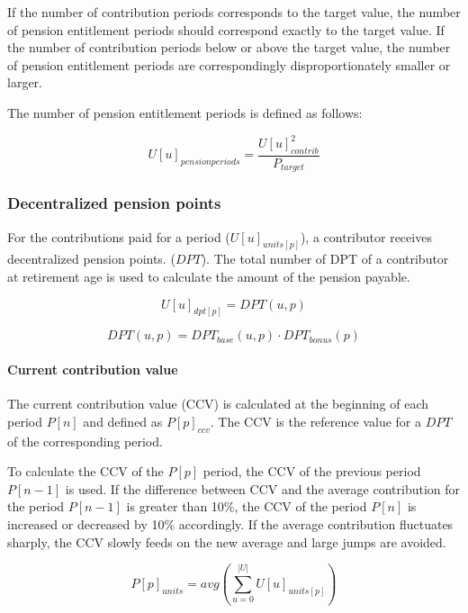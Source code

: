If the number of contribution periods corresponds to the target value, the number of pension entitlement periods should correspond exactly to the target value. If the number of contribution periods below or above the target value, the number of pension entitlement periods are correspondingly disproportionately smaller or larger.  

The number of pension entitlement periods is defined as follows:

\begin{equation}
U[u]_{pensionperiods} = \frac{U[u]_{contrib}^2}{P_{target}}
\end{equation}


\subsubsection{Decentralized pension points}
For the contributions paid for a period ($U[u]_{units[p]}$), a contributor receives decentralized pension points.
($DPT$). The total number of DPT of a contributor at retirement age is used to calculate the amount of the pension payable.

\begin{equation}
U[u]_{dpt[p]} = DPT(u, p)
\end{equation}

\begin{equation}
DPT(u, p) = DPT_{base}(u, p) \cdot DPT_{bonus}(p)
\end{equation}

\paragraph*{Current contribution value}
The current contribution value (CCV) is calculated at the beginning of each period $P[n]$ and defined as $P[p]_{ccv}$. The CCV is the reference value for a $DPT$ of the corresponding period.

To calculate the CCV of the $P[p]$ period, the CCV of the previous period $P[n-1]$ is used.
If the difference between CCV and the average contribution for the period $P[n-1]$ is greater than 10\%, the CCV of the period $P[n]$ is increased or decreased by 10\% accordingly.
If the average contribution fluctuates sharply, the CCV slowly feeds on the new average and large jumps are avoided.


\begin{equation}
P[p]_{units} = avg(\sum_{u=0}^{|U|} U[u]_{units[p]})
\end{equation}

